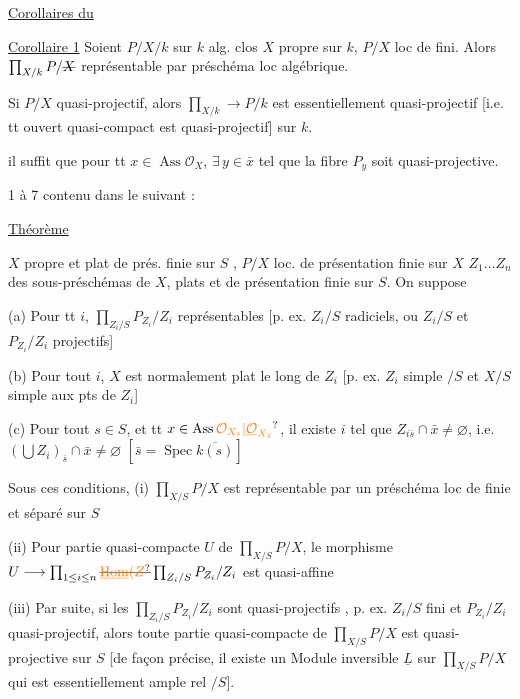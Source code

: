 \uline{Corollaires du }

\uline{Corollaire 1} Soient $P/X/k$ sur $k$ alg. clos  $X$ propre sur $k$, $P/X$ loc de  fini. Alors $\prod_{X/k}P/\deleted{X}$ représentable par préschéma loc  algébrique.

Si $P/X$ quasi-projectif, alors $\prod_{X/k}\longrightarrow{}P/k$ est essentiellement quasi-projectif [i.e. tt ouvert quasi-compact est quasi-projectif] sur $k$.

\unsure{$\swarrow$} il suffit que pour tt $x\in\operatorname{Ass}\mathcal O_X$, $\exists\,y\in\bar x$ tel que la fibre $P_y$ soit quasi-projective.

 1 à 7 contenu dans le suivant :

\uline{Théorème}

$X$ propre et plat de prés. finie sur $S$ , $P/X$ loc. de présentation finie sur $X$ $Z_1\ldots Z_n$ des sous-préschémas  de $X$, plats et de présentation finie sur $S$. On suppose

(a) Pour tt $i$, $\prod_{Z_i/S}P_{Z_i}/Z_i$ représentables [p. ex. $Z_i/S$ radiciels, ou $Z_i/S$ et $P_{Z_i}/Z_i$ projectifs]

(b) Pour tout $i$, $X$ est normalement plat le long de $Z_i$ [p. ex. $Z_i$ simple $/S$ et $X/S$ simple aux pts de $Z_i$]

(c) Pour tout $s\in S$, et tt $x\in\operatorname{Ass}\unsure{\mathcal O_{X_{\bar s}}|\underline{\mathcal O}_{X_{\bar s}}}$, il existe $i$ tel que $Z_{i\bar s}\cap\bar x\ne\varnothing$, i.e. $(\bigcup Z_i)_{\bar s}\cap\bar x\ne\varnothing$ $[\bar s=\operatorname{Spec}\overline{k(s)}]$

Sous ces conditions, (i) $\prod_{X/S}P/X$ est représentable par un préschéma loc de  finie et séparé sur $S$

 (ii)  Pour  partie  quasi-compacte $U$ de $\prod_{X/S}P/X$,  le morphisme $U\longrightarrow\prod_{1\leq i\leq n}\deleted{\unsure{\underline{\operatorname{Hom}}(Z}}\prod_{Z_i/S}P_{Z_i}/Z_i$ est quasi-affine

(iii) Par suite, si les $\prod_{Z_i/S}P_{Z_i}/Z_i$ sont quasi-projectifs , p. ex. $Z_i/S$ fini et $P_{Z_i}/Z_i$ quasi-projectif, alors toute partie quasi-compacte de $\prod_{X/S}P/X$ est quasi-projective sur $S$ [de façon précise, il existe un Module inversible $\underline L$ sur $\prod_{X/S}P/X$ qui est essentiellement ample rel $/S$].

